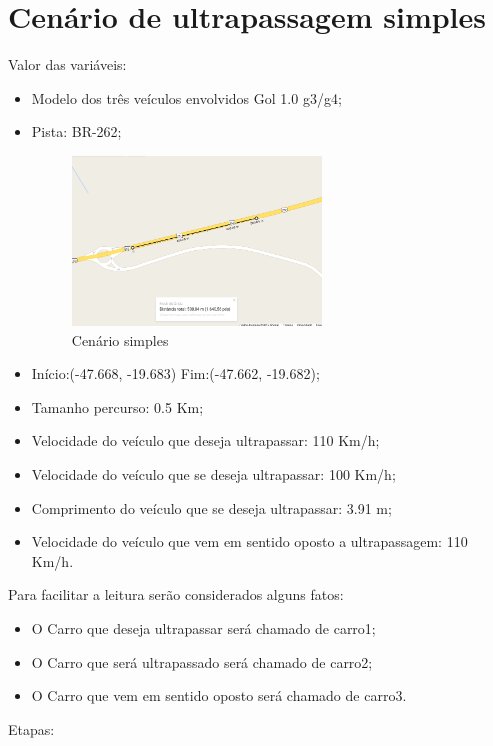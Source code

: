 \section{Cenário de ultrapassagem simples}

Valor das variáveis:

\begin{itemize}
	\item Modelo dos três veículos envolvidos Gol 1.0 g3/g4;
	\item Pista: BR-262;
	
\begin{figure}[h!]
  \centering
  \includegraphics[width=250px, scale=1]{figuras/modelo_pista}
  \caption{Cenário simples}
\label{fig:modelo_pista}
\end{figure}

	\item Início:(-47.668, -19.683) Fim:(-47.662, -19.682);
	\item Tamanho percurso: 0.5 Km;
	\item Velocidade do veículo que deseja ultrapassar: 110 Km/h;
	\item Velocidade do veículo que se deseja ultrapassar: 100 Km/h;
	\item Comprimento do veículo que se deseja ultrapassar: 3.91 m;
	\item Velocidade do veículo que vem em sentido oposto a ultrapassagem: 110 Km/h.
\end{itemize}
	
	
Para facilitar a leitura serão considerados alguns fatos: 

\begin{itemize}
	\item O Carro que deseja ultrapassar será chamado de carro1;
	\item O Carro que será ultrapassado será chamado de carro2;
	\item O Carro que vem em sentido oposto será chamado de carro3.
\end{itemize}

Etapas:

